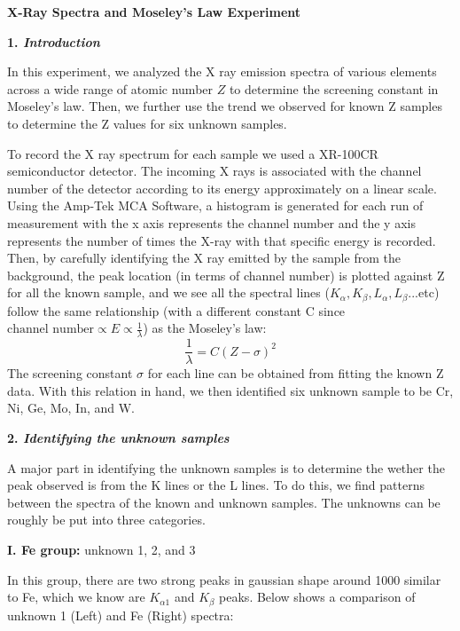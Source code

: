\documentclass[12pt]{article}
\begin{document}
\textbf{X-Ray Spectra and Moseley’s Law Experiment}
\bigskip

\textbf{1. \textit{Introduction}}
\smallskip

In this experiment, we analyzed the X ray emission spectra of various elements across a wide range of atomic number $Z$ to determine the screening constant in Moseley's law. Then, we further use the trend we observed for known Z samples to determine the Z values for six unknown samples.

To record the X ray spectrum for each sample we used a XR-100CR semiconductor detector. The incoming X rays is associated with the channel number of the detector according to its energy approximately on a linear scale. Using the Amp-Tek MCA Software, a histogram is generated for each run of measurement with the x axis represents the channel number and the y axis represents the number of times the X-ray with that specific energy is recorded. Then, by carefully identifying the X ray emitted by the sample from the background, the peak location (in terms of channel number) is plotted against Z for all the known sample, and we see all the spectral lines ($K_{\alpha}, K_{\beta}, L_{\alpha}, L_{\beta}$...etc) follow the same relationship (with a different constant C since $\text{channel number} \propto E \propto \frac{1}{\lambda}$) as the Moseley's law:
$$\frac{1}{\lambda} = C(Z- \sigma)^2$$
The screening constant $\sigma$ for each line can be obtained from fitting the known Z data. With this relation in hand, we then identified six unknown sample to be Cr, Ni, Ge, Mo, In, and W.
\bigskip

\textbf{2. \textit{Identifying the unknown samples}}
\smallskip

A major part in identifying the unknown samples is to determine the wether the peak observed is from the K lines or the L lines. To do this, we find patterns between the spectra of the known and unknown samples. The unknowns can be roughly be put into three categories. 

\textbf{I. Fe group:} unknown 1, 2, and 3

In this group, there are two strong peaks in gaussian shape around 1000 similar to Fe, which we know are $K_{\alpha1}$ and $K_{\beta}$ peaks. Below shows a comparison of unknown 1 (Left) and Fe (Right) spectra:
\end{document}
